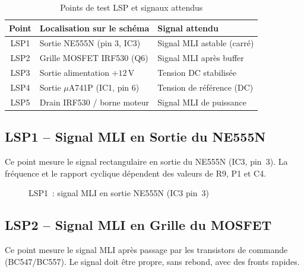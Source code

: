 \documentclass[a4paper,12pt,openany]{book}
\begin{document}
\begin{table}[H]
  \centering
  \caption{Points de test LSP et signaux attendus}
  \begin{tabular}{|c|l|l|}
    \hline
    \textbf{Point} & \textbf{Localisation sur le sch\'ema} & \textbf{Signal attendu} \\
    \hline
    LSP1 & Sortie NE555N (pin 3, IC3)      & Signal MLI astable (carr\'e) \\
    LSP2 & Grille MOSFET IRF530 (Q6)       & Signal MLI apr\`es buffer \\
    LSP3 & Sortie alimentation $+12$\,V    & Tension DC stabilis\'ee \\
    LSP4 & Sortie $\mu$A741P (IC1, pin 6)  & Tension de r\'ef\'erence (DC) \\
    LSP5 & Drain IRF530 / borne moteur     & Signal MLI de puissance \\
    \hline
  \end{tabular}
  \label{tab:lsp}
\end{table}

\subsection{LSP1 -- Signal MLI en Sortie du NE555N}

Ce point mesure le signal rectangulaire en sortie du NE555N (IC3, pin~3).
La fr\'equence et le rapport cyclique d\'ependent des valeurs de R9, P1 et C4.

\begin{figure}[H]
  \centering
  \caption{LSP1~: signal MLI en sortie NE555N (IC3 pin~3)}
  \label{fig:lsp1}
\end{figure}

\subsection{LSP2 -- Signal MLI en Grille du MOSFET}

Ce point mesure le signal MLI apr\`es passage par les transistors de
commande (BC547/BC557). Le signal doit \^etre propre, sans rebond, avec
des fronts rapides.
\end{document}
